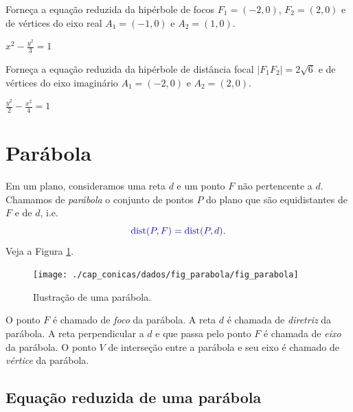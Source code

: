 \begin{exer}
  Forneça a equação reduzida da hipérbole de focos $F_1=(-2, 0)$, $F_2=(2, 0)$ e de vértices do eixo real $A_1=(-1, 0)$ e $A_2=(1, 0)$.
\end{exer}
\begin{resp}
  $\displaystyle x^2 - \frac{y^2}{3} = 1$
\end{resp}

\begin{exer}
  Forneça a equação reduzida da hipérbole de distância focal $|F_1F_2|=2\sqrt{6}$ e de vértices do eixo imaginário $A_1=(-2, 0)$ e $A_2=(2, 0)$.
\end{exer}
\begin{resp}
  $\displaystyle \frac{y^2}{2} - \frac{x^2}{4} = 1$
\end{resp}

\section{Parábola}\label{cap_conicas_sec_parabola}

Em um plano, consideramos uma reta $d$ e um ponto $F$ não pertencente a $d$. Chamamos de \emph{parábola} o conjunto de pontos $P$ do plano que são equidistantes de $F$ e de $d$, i.e.
\begin{equation}
  {\color{blue}\operatorname{dist}(P, F) = \operatorname{dist}(P, d)}.
\end{equation}
Veja a Figura \ref{fig:parabola}.

\begin{figure}[H]
  \centering
  \texttt{[image: ./cap\_conicas/dados/fig\_parabola/fig\_parabola]}
  \caption{Ilustração de uma parábola.}
  \label{fig:parabola}
\end{figure}

O ponto $F$ é chamado de \emph{foco} da parábola. A reta $d$ é chamada de \emph{diretriz} da parábola. A reta perpendicular a $d$ e que passa pelo ponto $F$ é chamada de \emph{eixo} da parábola. O ponto $V$ de interseção entre a parábola e seu eixo é chamado de \emph{vértice} da parábola.

\subsection{Equação reduzida de uma parábola}

